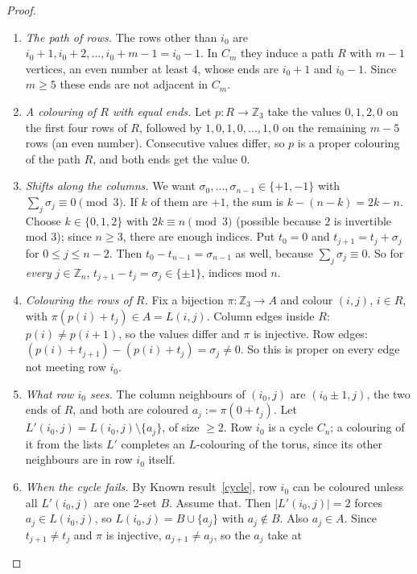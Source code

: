\documentclass[11pt]{article}
\theoremstyle{plain}
\theoremstyle{definition}
\theoremstyle{remark}
\newcommand{\Z}{\mathbb{Z}}
\newcommand{\sm}{\setminus}
\newenvironment{steps}[1][]{\begin{enumerate}[label=\textbf{Step \arabic*.},leftmargin=4.4em,itemsep=0.35em,#1]}{\end{enumerate}}
\begin{document}
\begin{proof}
\begin{steps}
\item \emph{The path of rows.} The rows other than $i_0$ are $i_0 + 1, i_0 + 2, \dots, i_0 + m - 1 = i_0 - 1$.
In $C_m$ they induce a path $R$ with $m - 1$ vertices, an even number at least $4$, whose ends are $i_0 + 1$ and
$i_0 - 1$. Since $m \ge 5$ these ends are not adjacent in $C_m$.
\item \emph{A colouring of $R$ with equal ends.} Let $p : R \to \Z_3$ take the values $0, 1, 2, 0$ on the first four
rows of $R$, followed by $1, 0, 1, 0, \dots, 1, 0$ on the remaining $m - 5$ rows (an even number). Consecutive values
differ, so $p$ is a proper colouring of the path $R$, and both ends get the value $0$.
\item \emph{Shifts along the columns.} We want $\sigma_0, \dots, \sigma_{n-1} \in \{+1, -1\}$ with
$\sum_j \sigma_j \equiv 0 \pmod 3$. If $k$ of them are $+1$, the sum is $k - (n - k) = 2k - n$. Choose
$k \in \{0, 1, 2\}$ with $2k \equiv n \pmod 3$ (possible because $2$ is invertible mod $3$); since $n \ge 3$, there
are enough indices. Put $t_0 = 0$ and $t_{j+1} = t_j + \sigma_j$ for $0 \le j \le n - 2$. Then
$t_0 - t_{n-1} = \sigma_{n-1}$ as well, because $\sum_j \sigma_j \equiv 0$. So for \emph{every} $j \in \Z_n$,
$t_{j+1} - t_j = \sigma_j \in \{\pm 1\}$, indices mod $n$.
\item \emph{Colouring the rows of $R$.} Fix a bijection $\pi : \Z_3 \to A$ and colour $(i, j)$, $i \in R$, with
$\pi(p(i) + t_j) \in A = L(i, j)$. Column edges inside $R$: $p(i) \ne p(i+1)$, so the values differ and $\pi$ is
injective. Row edges: $(p(i) + t_{j+1}) - (p(i) + t_j) = \sigma_j \ne 0$. So this is proper on every edge not meeting
row $i_0$.
\item \emph{What row $i_0$ sees.} The column neighbours of $(i_0, j)$ are $(i_0 \pm 1, j)$, the two ends of $R$, and both
are coloured $a_j := \pi(0 + t_j)$. Let $L'(i_0, j) = L(i_0, j) \sm \{a_j\}$, of size $\ge 2$. Row $i_0$ is a cycle $C_n$; a
colouring of it from the lists $L'$ completes an $L$-colouring of the torus, since its other neighbours are in row
$i_0$ itself.
\item \emph{When the cycle fails.} By Known result~\ref{cycle}, row $i_0$ can be coloured unless all $L'(i_0, j)$ are
one 2-set $B$. Assume that. Then $|L'(i_0,j)| = 2$ forces $a_j \in L(i_0, j)$, so $L(i_0, j) = B \cup \{a_j\}$ with
$a_j \notin B$. Also $a_j \in A$. Since $t_{j+1} \ne t_j$ and $\pi$ is injective, $a_{j+1} \ne a_j$, so the $a_j$ take at

\end{steps}
\end{proof}
\end{document}
